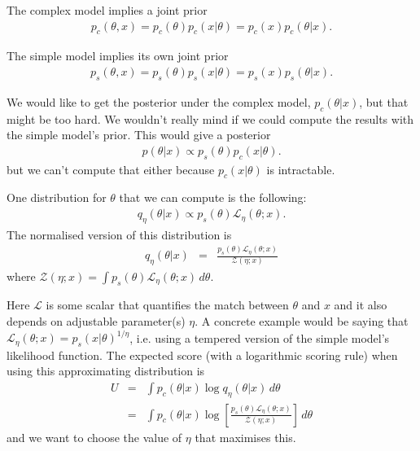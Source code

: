 \documentclass[a4paper, 11pt]{article}
\begin{document}

The complex model implies a joint prior
\begin{eqnarray}
p_c(\theta, x) = p_c(\theta)p_c(x|\theta) = p_c(x)p_c(\theta|x).
\end{eqnarray}

The simple model implies its own joint prior
\begin{eqnarray}
p_s(\theta, x) = p_s(\theta)p_s(x|\theta) = p_s(x)p_s(\theta|x).
\end{eqnarray}

We would like to get the posterior under the complex model, $p_c(\theta|x)$,
but that might be too hard.
We wouldn't really mind if we could compute the results with the
simple model's prior. This would give a posterior
\begin{eqnarray}
p(\theta | x) \propto p_s(\theta)p_c(x|\theta).
\end{eqnarray}
but we can't compute that either because $p_c(x|\theta)$ is intractable.

One distribution for $\theta$ that we can compute is the following:
\begin{eqnarray}
q_\eta(\theta | x) \propto p_s(\theta)\mathcal{L}_\eta(\theta; x).
\end{eqnarray}
The normalised version of this distribution is
\begin{eqnarray}
q_\eta(\theta | x) &=& \frac{p_s(\theta)\mathcal{L}_\eta(\theta; x)}
{\mathcal{Z}(\eta; x)}
\end{eqnarray}
where $\mathcal{Z}(\eta; x) = \int p_s(\theta)\mathcal{L}_\eta(\theta; x) \, d\theta$.

Here $\mathcal{L}$ is some scalar that quantifies the match between $\theta$ and
$x$ and it also depends on adjustable parameter(s) $\eta$. A concrete example
would be saying that $\mathcal{L}_\eta(\theta; x) = p_s(x|\theta)^{1/\eta}$, i.e.
using a tempered version of the simple model's likelihood function.
The expected score (with a logarithmic scoring rule) when using this approximating
distribution is
\begin{eqnarray}
U &=& \int p_c(\theta | x) \log q_\eta(\theta | x) \, d\theta\\
&=& \int p_c(\theta | x) \log \left[\frac{p_s(\theta)\mathcal{L}_\eta(\theta; x)}
{\mathcal{Z}(\eta; x)}\right] \, d\theta
\end{eqnarray}
and we want to choose the value of $\eta$ that maximises this.

\end{document}
